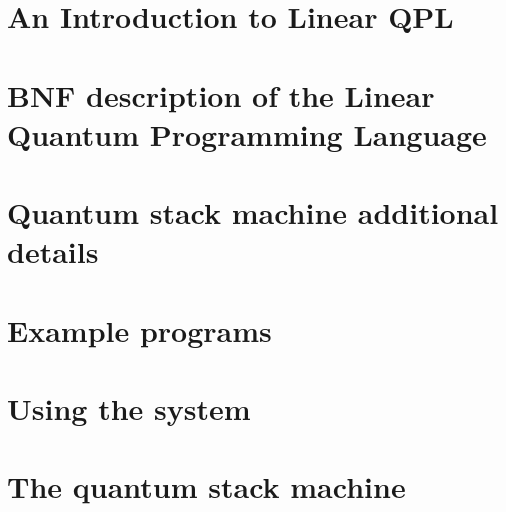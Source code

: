 \chapter{An Introduction to Linear QPL}\label{chap:informalintroductionLinearQuantumProgrammingLanguage}




\chapter{BNF description of  the Linear Quantum Programming Language}\label{chap:formalSpecificationLinearQuantumProgrammingLanguage}

\chapter{Quantum stack machine additional details}\label{chap:qsmadditional}


%
%
\chapter{Example \protect{\lqpl{}} programs}\label{app:exampleprograms}

\clearpage

\clearpage

\clearpage

\chapter{Using the system}\label{app:usethesystem}




\appendix
\chapter{The quantum stack machine}\label{chap:quantumStackMachine}




